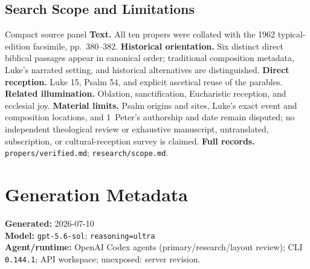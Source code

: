 \begin{deepstudy}
\subsection*{Search Scope and Limitations}

\begin{studybox}{Compact source panel}
\textbf{Text.} All ten propers were collated with the 1962 typical-edition facsimile, pp.~380--382. \textbf{Historical orientation.} Six distinct direct biblical passages appear in canonical order; traditional composition metadata, Luke's narrated setting, and historical alternatives are distinguished. \textbf{Direct reception.} Luke 15, Psalm 54, and explicit ascetical reuse of the parables. \textbf{Related illumination.} Oblation, sanctification, Eucharistic reception, and ecclesial joy. \textbf{Material limits.} Psalm origins and sites, Luke's exact event and composition locations, and 1~Peter's authorship and date remain disputed; no independent theological review or exhaustive manuscript, untranslated, subscription, or cultural-reception survey is claimed. \textbf{Full records.} \nolinkurl{propers/verified.md}; \nolinkurl{research/scope.md}.
\end{studybox}

\section*{Generation Metadata}

{\footnotesize
\textbf{Generated:} 2026-07-10\\
\textbf{Model:} \texttt{gpt-5.6-sol}; \texttt{reasoning=ultra}\\
\textbf{Agent/runtime:} OpenAI Codex agents (primary/research/layout review); CLI \texttt{0.144.1}; API workspace; unexposed: server revision.\par
}

\end{deepstudy}

